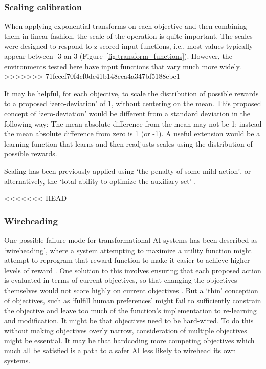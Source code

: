 \subsubsection{Scaling calibration}

When applying exponential transforms  on each objective and then combining them in linear fashion, the scale of the operation is quite important. The scales were designed to respond to z-scored input functions, i.e., most values typically appear between -3 an 3 (Figure~\ref{fig:transform_functions}). However, the environments tested here have input functions that vary much more widely.
>>>>>>> 71feeef70f4cf0dc41b148eca4a347bf5188ebe1

It may be helpful, for each objective, to scale the distribution of possible rewards to a proposed `zero-deviation' of 1, without centering on the mean. This proposed concept of `zero-deviation' would be different from a standard deviation in the following way: The mean absolute difference from the mean may not be 1; instead the mean absolute difference from zero is 1 (or -1). A useful extension would be a learning function that learns and then readjusts scales using the distribution of possible rewards.

Scaling has been previously applied using `the penalty of some mild action', or alternatively, the `total ability to optimize the auxiliary set' %
\cite{turner_conservative_2020}.

<<<<<<< HEAD

\subsubsection{Wireheading}

One possible failure mode for  transformational AI systems has been described as `wireheading', where a system attempting to maximize a utility function might attempt to reprogram that reward function to make it easier to achieve higher levels of reward \cite{demski_a_stable_2017}. One solution to this involves ensuring that each proposed action is evaluated in terms of current objectives, so that changing the objectives themselves would not score highly on current objectives \cite{dewey_learning_2011}. But a `thin' conception of objectives, such as `fulfill human preferences' might fail to sufficiently constrain the objective and leave too much of the function's implementation to re-learning and modification. It might be that objectives need to be hard-wired. To do this without making objectives overly narrow, consideration of multiple objectives might be essential. It may be that hardcoding more competing objectives which much all be satisfied is a path to a safer AI less likely to wirehead its own systems.



